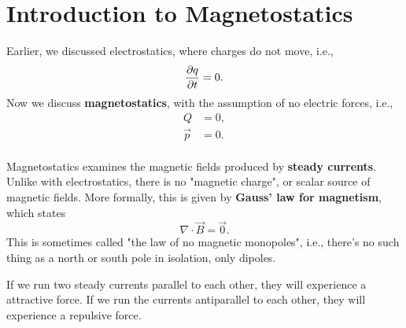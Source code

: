 \chapter{Introduction to Magnetostatics}

Earlier, we discussed electrostatics, where charges do not move, i.e.,
\begin{equation}
    \pdv{q}{t} = 0.
\end{equation}
Now we discuss \textbf{magnetostatics},
with the assumption of no electric forces, i.e.,
\begin{equation}
    \begin{aligned}
        Q &= 0, \\
        \vec{p} &= 0. \\
    \end{aligned}
\end{equation}

Magnetostatics examines the magnetic fields
produced by \textbf{steady currents}.
Unlike with electrostatics, there is no "magnetic charge",
or scalar source of magnetic fields.
More formally, this is given by \textbf{Gauss' law for magnetism}, which states
\begin{equation}
    \nabla \cdot \vec{B} = \vec{0}.
\end{equation}
This is sometimes called "the law of no magnetic monopoles",
i.e., there's no such thing as a north or south pole in isolation, only dipoles.

If we run two steady currents parallel to each other,
they will experience a attractive force.
If we run the currents antiparallel to each other,
they will experience a repulsive force.

